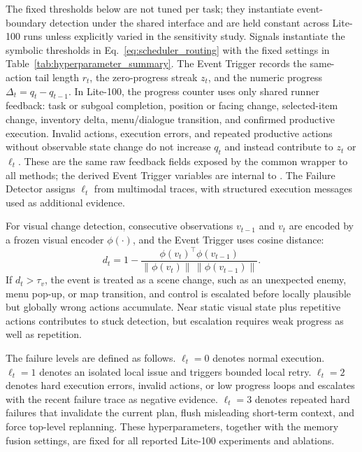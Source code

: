 \label{sec:appendix_scheduler_signals}
The fixed thresholds below are not tuned per task; they instantiate
event-boundary detection under the shared \stardojo{} interface and are held
constant across Lite-100 runs unless explicitly varied in the sensitivity study.
Signals instantiate the symbolic thresholds in Eq.~\mbox{\ref{eq:scheduler_routing}}
with the fixed settings in Table~\mbox{\ref{tab:hyperparameter_summary}}. The
Event Trigger records the same-action tail length $r_t$, the zero-progress streak
$z_t$, and the numeric progress $\Delta_t=q_t-q_{t-1}$. In Lite-100, the
progress counter uses only shared runner feedback: task or subgoal completion,
position or facing change, selected-item change, inventory delta, menu/dialogue
transition, and confirmed productive execution. Invalid actions, execution
errors, and repeated productive actions without observable state change do not
increase $q_t$ and instead contribute to $z_t$ or $\ell_t$. These are the same
raw feedback fields exposed by the common wrapper to all methods; the derived
Event Trigger variables are internal to \method{}. The Failure Detector assigns
$\ell_t$ from multimodal traces, with structured execution messages used as
additional evidence.

For visual change detection, consecutive observations $v_{t-1}$ and $v_t$ are
encoded by a frozen visual encoder $\phi(\cdot)$, and the Event Trigger
uses cosine distance:
\begin{equation}
\label{eq:visual_distance}
d_t = 1 - \frac{\phi(v_t)^{\top}\phi(v_{t-1})}{\|\phi(v_t)\|\,\|\phi(v_{t-1})\|}.
\end{equation}
If $d_t > \tau_v$, the event is treated as a scene change, such as an unexpected
enemy, menu pop-up, or map transition, and control is escalated before locally
plausible but globally wrong actions accumulate. Near static visual state plus
repetitive actions contributes to stuck detection, but escalation requires weak
progress as well as repetition.

The failure levels are defined as follows. $\ell_t=0$ denotes normal execution.
$\ell_t=1$ denotes an isolated local issue and triggers bounded local retry.
$\ell_t=2$ denotes hard execution errors, invalid actions, or low progress loops
and escalates with the recent failure trace as negative evidence. $\ell_t=3$
denotes repeated hard failures that invalidate the current plan, flush
misleading short-term context, and force top-level replanning. These
hyperparameters, together with the memory fusion settings, are fixed for all
reported Lite-100 experiments and ablations.

